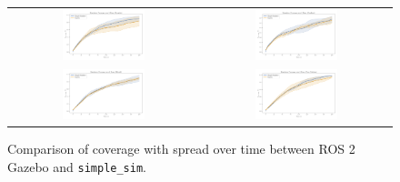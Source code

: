\begin{figure}[H]
  \centering
  \begin{tabular}{cc}
    \includegraphics[width=0.45\textwidth]{./figures/plots/consistency/gazebo_vs_simple_sim_roomba.png} &
    \includegraphics[width=0.45\textwidth]{./figures/plots/consistency/gazebo_vs_simple_sim_gradient.png} \\
    \includegraphics[width=0.45\textwidth]{./figures/plots/consistency/gazebo_vs_simple_sim_hybrid.png} &
    \includegraphics[width=0.45\textwidth]{./figures/plots/consistency/gazebo_vs_simple_sim_pure_pathing.png} \\
  \end{tabular}
  \caption{Comparison of coverage with spread over time between ROS 2 Gazebo and \texttt{simple\_sim}.}
  \label{fig:coverage-benchmark-all}
\end{figure}

